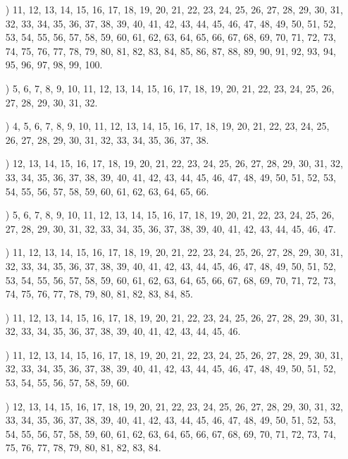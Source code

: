 \documentclass[a4paper,11pt]{article}
\numberwithin{equation}{section}
\begin{document}
\begin{itemize}
\item[\romannumeral9)] 11, 12, 13, 14, 15, 16, 17, 18, 19, 20, 21, 22, 23,
  24, 25, 26, 27, 28, 29, 30, 31, 32, 33, 34, 35, 36, 37, 38, 39, 40, 41,
  42, 43, 44, 45, 46, 47, 48, 49, 50, 51, 52, 53, 54, 55, 56, 57, 58, 59,
  60, 61, 62, 63, 64, 65, 66, 67, 68, 69, 70, 71, 72, 73, 74, 75, 76, 77,
  78, 79, 80, 81, 82, 83, 84, 85, 86, 87, 88, 89, 90, 91, 92, 93, 94, 95,
  96, 97, 98, 99, 100.

\item[\romannumeral10)] 5, 6, 7, 8, 9, 10, 11, 12, 13, 14, 15, 16, 17, 18,
  19, 20, 21, 22, 23, 24, 25, 26, 27, 28, 29, 30, 31, 32.

\item[\romannumeral11)] 4, 5, 6, 7, 8, 9, 10, 11, 12, 13, 14, 15, 16, 17,
  18, 19, 20, 21, 22, 23, 24, 25, 26, 27, 28, 29, 30, 31, 32, 33, 34, 35,
  36, 37, 38.

\item[\romannumeral12)] 12, 13, 14, 15, 16, 17, 18, 19, 20, 21, 22, 23, 24,
  25, 26, 27, 28, 29, 30, 31, 32, 33, 34, 35, 36, 37, 38, 39, 40, 41, 42,
  43, 44, 45, 46, 47, 48, 49, 50, 51, 52, 53, 54, 55, 56, 57, 58, 59, 60,
  61, 62, 63, 64, 65, 66.

\item[\romannumeral13)] 5, 6, 7, 8, 9, 10, 11, 12, 13, 14, 15, 16, 17, 18,
  19, 20, 21, 22, 23, 24, 25, 26, 27, 28, 29, 30, 31, 32, 33, 34, 35, 36,
  37, 38, 39, 40, 41, 42, 43, 44, 45, 46, 47.

\item[\romannumeral14)] 11, 12, 13, 14, 15, 16, 17, 18, 19, 20, 21, 22, 23,
  24, 25, 26, 27, 28, 29, 30, 31, 32, 33, 34, 35, 36, 37, 38, 39, 40, 41,
  42, 43, 44, 45, 46, 47, 48, 49, 50, 51, 52, 53, 54, 55, 56, 57, 58, 59,
  60, 61, 62, 63, 64, 65, 66, 67, 68, 69, 70, 71, 72, 73, 74, 75, 76, 77,
  78, 79, 80, 81, 82, 83, 84, 85.

\item[\romannumeral15)] 11, 12, 13, 14, 15, 16, 17, 18, 19, 20, 21, 22, 23,
  24, 25, 26, 27, 28, 29, 30, 31, 32, 33, 34, 35, 36, 37, 38, 39, 40, 41,
  42, 43, 44, 45, 46.

\item[\romannumeral16)] 11, 12, 13, 14, 15, 16, 17, 18, 19, 20, 21, 22, 23,
  24, 25, 26, 27, 28, 29, 30, 31, 32, 33, 34, 35, 36, 37, 38, 39, 40, 41,
  42, 43, 44, 45, 46, 47, 48, 49, 50, 51, 52, 53, 54, 55, 56, 57, 58, 59, 60.

\item[\romannumeral17)] 12, 13, 14, 15, 16, 17, 18, 19, 20, 21, 22, 23, 24,
  25, 26, 27, 28, 29, 30, 31, 32, 33, 34, 35, 36, 37, 38, 39, 40, 41, 42,
  43, 44, 45, 46, 47, 48, 49, 50, 51, 52, 53, 54, 55, 56, 57, 58, 59, 60,
  61, 62, 63, 64, 65, 66, 67, 68, 69, 70, 71, 72, 73, 74, 75, 76, 77, 78,
  79, 80, 81, 82, 83, 84.


\end{itemize}
\end{document}
